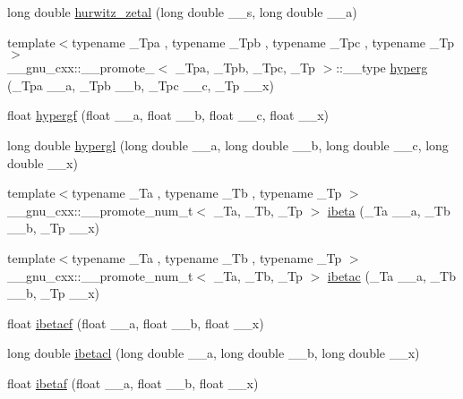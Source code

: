 \begin{DoxyCompactItemize}
\item 
long double \hyperlink{namespace____gnu__cxx_ad8f2cfc7e198755968bae35d46b49d5a}{hurwitz\+\_\+zetal} (long double \+\_\+\+\_\+s, long double \+\_\+\+\_\+a)
\item 
{\footnotesize template$<$typename \+\_\+\+Tpa , typename \+\_\+\+Tpb , typename \+\_\+\+Tpc , typename \+\_\+\+Tp $>$ }\\\+\_\+\+\_\+gnu\+\_\+cxx\+::\+\_\+\+\_\+promote\+\_$<$ \+\_\+\+Tpa, \+\_\+\+Tpb, \+\_\+\+Tpc, \+\_\+\+Tp $>$\+::\+\_\+\+\_\+type \hyperlink{namespace____gnu__cxx_af52cf49736c63b0bb000be98b53c221f}{hyperg} (\+\_\+\+Tpa \+\_\+\+\_\+a, \+\_\+\+Tpb \+\_\+\+\_\+b, \+\_\+\+Tpc \+\_\+\+\_\+c, \+\_\+\+Tp \+\_\+\+\_\+x)
\item 
float \hyperlink{namespace____gnu__cxx_ac4c81e4ea9cef149fe40291ca10d7e15}{hypergf} (float \+\_\+\+\_\+a, float \+\_\+\+\_\+b, float \+\_\+\+\_\+c, float \+\_\+\+\_\+x)
\item 
long double \hyperlink{namespace____gnu__cxx_a9961967087216e97f76283f29e1be152}{hypergl} (long double \+\_\+\+\_\+a, long double \+\_\+\+\_\+b, long double \+\_\+\+\_\+c, long double \+\_\+\+\_\+x)
\item 
{\footnotesize template$<$typename \+\_\+\+Ta , typename \+\_\+\+Tb , typename \+\_\+\+Tp $>$ }\\\+\_\+\+\_\+gnu\+\_\+cxx\+::\+\_\+\+\_\+promote\+\_\+num\+\_\+t$<$ \+\_\+\+Ta, \+\_\+\+Tb, \+\_\+\+Tp $>$ \hyperlink{namespace____gnu__cxx_a99e687949634408cd1050cceedbdf962}{ibeta} (\+\_\+\+Ta \+\_\+\+\_\+a, \+\_\+\+Tb \+\_\+\+\_\+b, \+\_\+\+Tp \+\_\+\+\_\+x)
\item 
{\footnotesize template$<$typename \+\_\+\+Ta , typename \+\_\+\+Tb , typename \+\_\+\+Tp $>$ }\\\+\_\+\+\_\+gnu\+\_\+cxx\+::\+\_\+\+\_\+promote\+\_\+num\+\_\+t$<$ \+\_\+\+Ta, \+\_\+\+Tb, \+\_\+\+Tp $>$ \hyperlink{namespace____gnu__cxx_a474e422dce07316da26bb2c2579b7968}{ibetac} (\+\_\+\+Ta \+\_\+\+\_\+a, \+\_\+\+Tb \+\_\+\+\_\+b, \+\_\+\+Tp \+\_\+\+\_\+x)
\item 
float \hyperlink{namespace____gnu__cxx_abd7fa090deead18b167c26b8994b9f53}{ibetacf} (float \+\_\+\+\_\+a, float \+\_\+\+\_\+b, float \+\_\+\+\_\+x)
\item 
long double \hyperlink{namespace____gnu__cxx_a48995d537b82e426362a4831ffa1be39}{ibetacl} (long double \+\_\+\+\_\+a, long double \+\_\+\+\_\+b, long double \+\_\+\+\_\+x)
\item 
float \hyperlink{namespace____gnu__cxx_a97a5e3afdd990a2d3e199df6856bcf9f}{ibetaf} (float \+\_\+\+\_\+a, float \+\_\+\+\_\+b, float \+\_\+\+\_\+x)

\end{DoxyCompactItemize}
